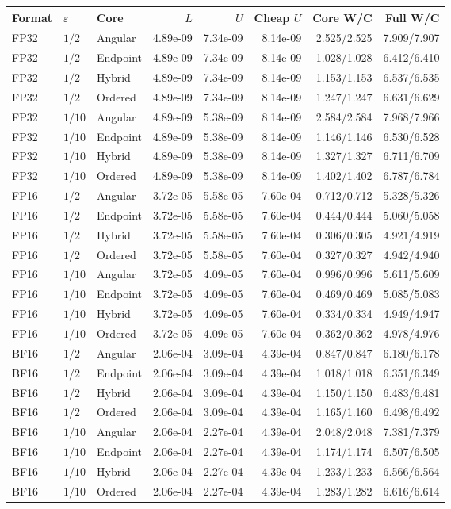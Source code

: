 \begin{tabular}{lllrrrrr}
\toprule
Format & $\varepsilon$ & Core & $L$ & $U$ & Cheap $U$ & Core W/C & Full W/C \\
\midrule
FP32 & $1/2$ & Angular & 4.89e-09 & 7.34e-09 & 8.14e-09 & 2.525/2.525 & 7.909/7.907 \\
FP32 & $1/2$ & Endpoint & 4.89e-09 & 7.34e-09 & 8.14e-09 & 1.028/1.028 & 6.412/6.410 \\
FP32 & $1/2$ & Hybrid & 4.89e-09 & 7.34e-09 & 8.14e-09 & 1.153/1.153 & 6.537/6.535 \\
FP32 & $1/2$ & Ordered & 4.89e-09 & 7.34e-09 & 8.14e-09 & 1.247/1.247 & 6.631/6.629 \\
FP32 & $1/10$ & Angular & 4.89e-09 & 5.38e-09 & 8.14e-09 & 2.584/2.584 & 7.968/7.966 \\
FP32 & $1/10$ & Endpoint & 4.89e-09 & 5.38e-09 & 8.14e-09 & 1.146/1.146 & 6.530/6.528 \\
FP32 & $1/10$ & Hybrid & 4.89e-09 & 5.38e-09 & 8.14e-09 & 1.327/1.327 & 6.711/6.709 \\
FP32 & $1/10$ & Ordered & 4.89e-09 & 5.38e-09 & 8.14e-09 & 1.402/1.402 & 6.787/6.784 \\
FP16 & $1/2$ & Angular & 3.72e-05 & 5.58e-05 & 7.60e-04 & 0.712/0.712 & 5.328/5.326 \\
FP16 & $1/2$ & Endpoint & 3.72e-05 & 5.58e-05 & 7.60e-04 & 0.444/0.444 & 5.060/5.058 \\
FP16 & $1/2$ & Hybrid & 3.72e-05 & 5.58e-05 & 7.60e-04 & 0.306/0.305 & 4.921/4.919 \\
FP16 & $1/2$ & Ordered & 3.72e-05 & 5.58e-05 & 7.60e-04 & 0.327/0.327 & 4.942/4.940 \\
FP16 & $1/10$ & Angular & 3.72e-05 & 4.09e-05 & 7.60e-04 & 0.996/0.996 & 5.611/5.609 \\
FP16 & $1/10$ & Endpoint & 3.72e-05 & 4.09e-05 & 7.60e-04 & 0.469/0.469 & 5.085/5.083 \\
FP16 & $1/10$ & Hybrid & 3.72e-05 & 4.09e-05 & 7.60e-04 & 0.334/0.334 & 4.949/4.947 \\
FP16 & $1/10$ & Ordered & 3.72e-05 & 4.09e-05 & 7.60e-04 & 0.362/0.362 & 4.978/4.976 \\
BF16 & $1/2$ & Angular & 2.06e-04 & 3.09e-04 & 4.39e-04 & 0.847/0.847 & 6.180/6.178 \\
BF16 & $1/2$ & Endpoint & 2.06e-04 & 3.09e-04 & 4.39e-04 & 1.018/1.018 & 6.351/6.349 \\
BF16 & $1/2$ & Hybrid & 2.06e-04 & 3.09e-04 & 4.39e-04 & 1.150/1.150 & 6.483/6.481 \\
BF16 & $1/2$ & Ordered & 2.06e-04 & 3.09e-04 & 4.39e-04 & 1.165/1.160 & 6.498/6.492 \\
BF16 & $1/10$ & Angular & 2.06e-04 & 2.27e-04 & 4.39e-04 & 2.048/2.048 & 7.381/7.379 \\
BF16 & $1/10$ & Endpoint & 2.06e-04 & 2.27e-04 & 4.39e-04 & 1.174/1.174 & 6.507/6.505 \\
BF16 & $1/10$ & Hybrid & 2.06e-04 & 2.27e-04 & 4.39e-04 & 1.233/1.233 & 6.566/6.564 \\
BF16 & $1/10$ & Ordered & 2.06e-04 & 2.27e-04 & 4.39e-04 & 1.283/1.282 & 6.616/6.614 \\
\bottomrule
\end{tabular}
